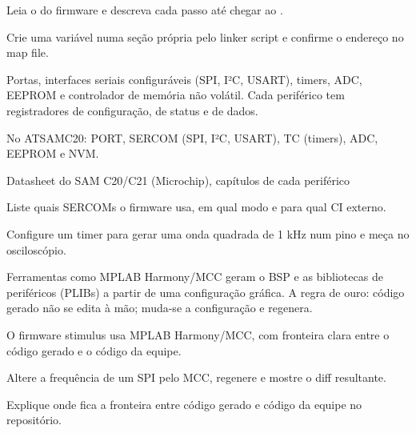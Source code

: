 \begin{pratique}
  \item Leia o  do firmware e descreva cada passo até chegar ao .
  \item Crie uma variável numa seção própria pelo linker script e confirme o endereço no map file.
\end{pratique}

Portas, interfaces seriais configuráveis (SPI, I²C, USART), timers, ADC, EEPROM e controlador de memória não volátil. Cada periférico tem registradores de configuração, de status e de dados.

\begin{noproduto}
No ATSAMC20: PORT, SERCOM (SPI, I²C, USART), TC (timers), ADC, EEPROM e NVM.
\end{noproduto}

\begin{paraestudar}
  \item Datasheet do SAM C20/C21 (Microchip), capítulos de cada periférico
\end{paraestudar}

\begin{pratique}
  \item Liste quais SERCOMs o firmware usa, em qual modo e para qual CI externo.
  \item Configure um timer para gerar uma onda quadrada de 1 kHz num pino e meça no osciloscópio.
\end{pratique}

Ferramentas como MPLAB Harmony/MCC geram o BSP e as bibliotecas de periféricos (PLIBs) a partir de uma configuração gráfica. A regra de ouro: código gerado não se edita à mão; muda-se a configuração e regenera.

\begin{noproduto}
O firmware stimulus usa MPLAB Harmony/MCC, com fronteira clara entre o código gerado e o código da equipe.
\end{noproduto}

\begin{paraestudar}
  \item {}
\end{paraestudar}

\begin{pratique}
  \item Altere a frequência de um SPI pelo MCC, regenere e mostre o diff resultante.
  \item Explique onde fica a fronteira entre código gerado e código da equipe no repositório.
\end{pratique}

